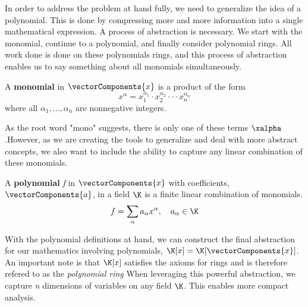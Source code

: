 In order to address the problem at hand fully, we need to generalize the idea of a polynomial. This is done by compressing more and more information into a single mathematical expression. A process of abstraction is necessary. We start with the monomial, continue to a polynomial, and finally consider polynomial rings. All work done is done on these polynomials rings, and this process of abstraction enables us to say something about all monomials simultaneously. 

\begin{definition}
A \textbf{monomial} in $\vectorComponents{x}$ is a product of the form
    \begin{equation}
        x^\alpha = x_1^{\alpha_1} \cdot x_2^{\alpha_2} \cdot\cdot\cdot x_n^{\alpha_n}
    \end{equation}
where all $\alpha_1,...,\alpha_n$ are nonnegative integers.
\end{definition}

As the root word "mono" suggests, there is only one of these terms $\xalpha$.However, as we are creating the tools to generalize and deal with more abstract concepts, we also want to include the ability to capture any linear combination of these monomials.

\begin{definition}
A \textbf{polynomial} \textit{f} in $\vectorComponents{x}$ with coefficients, $\vectorComponents{a}$, in a field $\K$ is a finite linear combination of monomials. 
    \begin{equation}
        f = \sum_{\alpha} a_{\alpha} x^\alpha,\quad a_{\alpha} \in \K
    \end{equation}
\end{definition}

With the polynomial definitions at hand, we can construct the final abstraction for our mathematics involving polynomials, $\K[x] = \K[\vectorComponents{x}]$. An important note is that $\K[x]$ satisfies the axioms for rings and is therefore refered to as the \textit{polynomial ring}  When leveraging this powerful abstraction, we capture \textit{n} dimensions of variables on any field $\K$. This enables more compact analysis.  